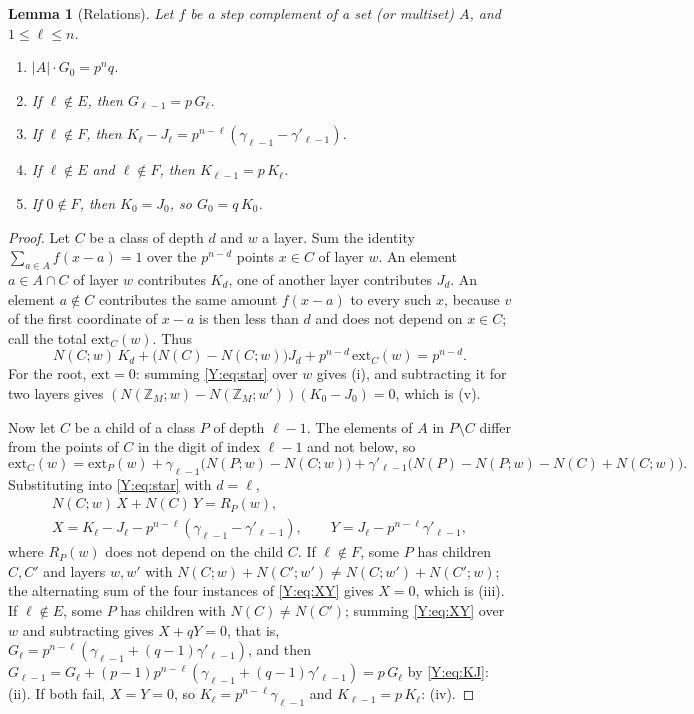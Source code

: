 \documentclass[11pt,a4paper]{amsart}
\newtheorem{lemma}[theorem]{Lemma}
\theoremstyle{definition}
\theoremstyle{remark}
\newcommand{\Z}{\mathbb{Z}}
\newcommand{\gs}{\gamma}
\newcommand{\gd}{\gamma'}
\begin{document}
\begin{lemma}[Relations]\label{Y:lem:rel}
Let $f$ be a step complement of a set (or multiset) $A$, and $1\le\ell\le n$.
\begin{enumerate}
\item[(i)] $|A|\cdot G_0=p^nq$.
\item[(ii)] If $\ell\notin E$, then $G_{\ell-1}=p\,G_\ell$.
\item[(iii)] If $\ell\notin F$, then $K_\ell-J_\ell=p^{n-\ell}(\gs_{\ell-1}-\gd_{\ell-1})$.
\item[(iv)] If $\ell\notin E$ and $\ell\notin F$, then $K_{\ell-1}=p\,K_\ell$.
\item[(v)] If $0\notin F$, then $K_0=J_0$, so $G_0=q\,K_0$.
\end{enumerate}
\end{lemma}

\begin{proof}
Let $C$ be a class of depth $d$ and $w$ a layer. Sum the identity $\sum_{a\in A}f(x-a)=1$ over the $p^{n-d}$
points $x\in C$ of layer $w$. An element $a\in A\cap C$ of layer $w$ contributes $K_d$, one of another layer
contributes $J_d$. An element $a\notin C$ contributes the same amount $f(x-a)$ to every such $x$, because
$v$ of the first coordinate of $x-a$ is then less than $d$ and does not depend on $x\in C$; call the total
$\mathrm{ext}_C(w)$. Thus
\begin{equation}\label{Y:eq:star}
 N(C;w)\,K_d+\bigl(N(C)-N(C;w)\bigr)J_d+p^{n-d}\,\mathrm{ext}_C(w)=p^{n-d}.
\end{equation}
For the root, $\mathrm{ext}=0$: summing \eqref{Y:eq:star} over $w$ gives (i), and subtracting it for two layers
gives $(N(\Z_M;w)-N(\Z_M;w'))(K_0-J_0)=0$, which is (v).

Now let $C$ be a child of a class $P$ of depth $\ell-1$. The elements of $A$ in $P\setminus C$ differ from
the points of $C$ in the digit of index $\ell-1$ and not below, so
\[
 \mathrm{ext}_C(w)=\mathrm{ext}_P(w)+\gs_{\ell-1}\bigl(N(P;w)-N(C;w)\bigr)
 +\gd_{\ell-1}\bigl(N(P)-N(P;w)-N(C)+N(C;w)\bigr).
\]
Substituting into \eqref{Y:eq:star} with $d=\ell$,
\begin{equation}\label{Y:eq:XY}
\begin{gathered}
 N(C;w)\,X+N(C)\,Y=R_P(w),\\
 X=K_\ell-J_\ell-p^{n-\ell}(\gs_{\ell-1}-\gd_{\ell-1}),\qquad Y=J_\ell-p^{n-\ell}\gd_{\ell-1},
\end{gathered}
\end{equation}
where $R_P(w)$ does not depend on the child $C$. If $\ell\notin F$, some $P$ has children $C,C'$ and layers
$w,w'$ with $N(C;w)+N(C';w')\ne N(C;w')+N(C';w)$; the alternating sum of the four instances of \eqref{Y:eq:XY}
gives $X=0$, which is (iii). If $\ell\notin E$, some $P$ has children with $N(C)\ne N(C')$; summing
\eqref{Y:eq:XY} over $w$ and subtracting gives $X+qY=0$, that is,
$G_\ell=p^{n-\ell}(\gs_{\ell-1}+(q-1)\gd_{\ell-1})$, and then
$G_{\ell-1}=G_\ell+(p-1)p^{n-\ell}(\gs_{\ell-1}+(q-1)\gd_{\ell-1})=p\,G_\ell$ by \eqref{Y:eq:KJ}: (ii). If both
fail, $X=Y=0$, so $K_\ell=p^{n-\ell}\gs_{\ell-1}$ and $K_{\ell-1}=p\,K_\ell$: (iv).
\end{proof}
\end{document}
